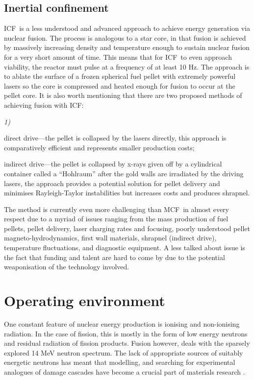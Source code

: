 \documentclass[12pt, a4paper]{article}
\newcommand{\mc}{MCF}
\newcommand{\ic}{ICF}
\begin{document}
		\subsection{Inertial confinement}\label{s:ic}
		\ic~is a less understood and advanced approach to achieve energy generation via nuclear fusion. The process is analogous to a star core, in that fusion is achieved by massively increasing density and temperature enough to sustain nuclear fusion for a very short amount of time. This means that for \ic~to even approach viability, the reactor must pulse at a frequency of at least 10 Hz. The approach is to ablate the surface of a frozen spherical fuel pellet with extremely powerful lasers so the core is compressed and heated enough for fusion to occur at the pellet core. It is also worth mentioning that there are two proposed methods of achieving fusion with \ic:
		\begin{inparaenum}{\itshape1\upshape)}
			\item direct drive---the pellet is collapsed by the lasers directly, this approach is comparatively efficient and represents smaller production costs;
			\item indirect drive---the pellet is collapsed by x-rays given off by a cylindrical container called a ``Hohlraum'' after the gold walls are irradiated by the driving lasers, the approach provides a potential solution for pellet delivery and minimises Rayleigh-Taylor instabilities but increases costs and produces shrapnel.
		\end{inparaenum}
		
		The method is currently even more challenging than \mc~in almost every respect due to a myriad of issues ranging from the mass production of fuel pellets, pellet delivery, laser charging rates and focusing, poorly understood pellet magneto-hydrodynamics, first wall materials, shrapnel (indirect drive), temperature fluctuations, and diagnostic equipment. A less talked about issue is the fact that funding and talent are hard to come by due to the potential weaponisation of the technology involved.
	\section{Operating environment}\label{s:op}
		One constant feature of nuclear energy production is ionising and non-ionising radiation. In the case of fission, this is mostly in the form of low energy neutrons and residual radiation of fission products. Fusion however, deals with the sparsely explored 14 MeV neutron spectrum. The lack of appropriate sources of suitably energetic neutrons has meant that modelling, and searching for experimental analogues of damage cascades have become a crucial part of materials research \cite{fusmat1s}.
		
\end{document}
